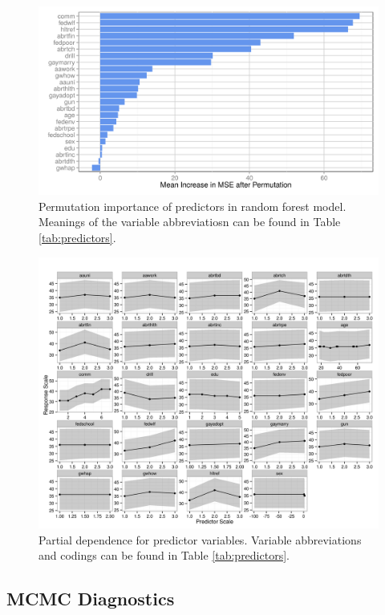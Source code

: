 \begin{figure}[ht!]
  \centering
  \includegraphics{../figures/main/varimp.png}
  \caption{Permutation importance of predictors in random forest model. Meanings of the variable abbreviatiosn can be found in Table \ref{tab:predictors}.}
  \label{fig:imp}
\end{figure}

\begin{figure}[ht!]
  \centering
  \includegraphics{../figures/main/partial_dependence.png}
  \caption{Partial dependence for predictor variables. Variable abbreviations and codings can be found in Table \ref{tab:predictors}.}
  \label{fig:pd}
\end{figure}



\clearpage

\subsection{MCMC Diagnostics}



